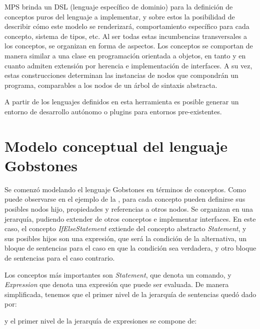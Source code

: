 MPS brinda un DSL (lenguaje específico de dominio) para la definición de conceptos puros del lenguaje a implementar, y sobre estos la posibilidad de describir cómo este modelo se renderizará, comportamiento específico para cada concepto, sistema de tipos, etc. Al ser todas estas incumbencias transversales a los conceptos, se organizan en forma de aspectos.
Los conceptos se comportan de manera similar a una clase en programación orientada a objetos, en tanto y en cuanto admiten extensión por herencia e implementación de interfaces. A su vez, estas construcciones determinan las instancias de nodos que compondrán un programa, comparables a los nodos de un árbol de sintaxis abstracta.

A partir de los lenguajes definidos en esta herramienta es posible generar un entorno de desarrollo autónomo o plugins para entornos pre-existentes.

\section{Modelo conceptual del lenguaje Gobstones}\label{dominio}

Se comenzó modelando el lenguaje Gobstones en términos de conceptos. Como puede observarse en el ejemplo de la , para cada concepto pueden definirse sus posibles nodos hijo, propiedades y referencias a otros nodos. Se organizan en una jerarquía, pudiendo extender de otros conceptos e implementar interfaces. En este caso, el concepto \textit{IfElseStatement} extiende del concepto abstracto \textit{Statement}, y sus posibles hijos son una expresión, que será la condición de la alternativa, un bloque de sentencias para el caso en que la condición sea verdadera, y otro bloque de sentencias para el caso contrario.


Los conceptos más importantes son \textit{Statement}, que denota un comando, y \textit{Expression} que denota una expresión que puede ser evaluada. De manera simplificada, tenemos que el primer nivel de la jerarquía de sentencias quedó dado por:

\centertree{
  [Statement 
      [Alternative ]
      [Loop]
      [Procedure]
      [Assignment]
  ]
}

\bigskip

\noindent y el primer nivel de la jerarquía de expresiones se compone de:

\centertree{
  [Expression 
      [BinaryOperation]
      [Value]
      [FunctionCall]
  ]
}

